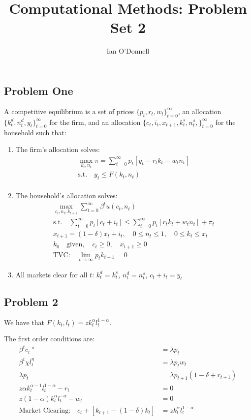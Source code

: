 \documentclass{article}
\title{Computational Methods: Problem Set 2}
\author{Ian O'Donnell}
\date{\vspace{-5ex}}
\begin{document}
\maketitle
\subsection*{Problem One}
A competitive equilibrium is a set of prices $ \{p_t , r_t, w_t\}_{t=0}^\infty $, an allocation $ \{k_t^d, n_t^d, y_t\}_{t=0}^\infty $
for the firm, and an allocation $ \{c_t, i_t, x_{t+1}, k_t^s, n_t^s,\}_{t=0}^\infty $ for the household such that: 
\begin{enumerate}
    \item The firm's allocation solves: 
    \begin{align*}
        \max_{k_t, n_t} \pi = \sum_{t=0}^{\infty} p_t [y_t - r_t k_t - w_t n_t] \\
        \text{s.t.} \quad y_t \leq F(k_t, n_t)\\
    \end{align*}

    \item The household's allocation solves: 
    \begin{gather*}
        \max_{c_t, n_t, k_{t+1}} \sum_{t=0}^{\infty} \beta^t u(c_t, n_t) \\
        \text{s.t.} \quad \sum_{t=0}^{\infty} p_t[c_t + i_t] \leq \sum_{t=0}^{\infty} p_t[r_t k_t + w_t n_t] + \pi _t \\
        x_{t+1} = (1-\delta) x_t + i_t, \quad 0 \leq n_t \leq 1, \quad 0 \leq k_t \leq x_t \\
        k_0 \quad \text{given}, \quad c_t \geq 0, \quad x_{t+1} \geq 0 \\
        \text{TVC:} \quad \lim_{t \rightarrow \infty} p_t k_{t+1} = 0 
    \end{gather*}

    \item All markets clear for all $t$: $k_t^d = k_t^s$, $n_t^d = n_t^s$, $c_t + i_t = y_t$
\end{enumerate}

\subsection*{Problem 2}
We have that $F(k_t, l_t) = z k_t^\alpha l_t^{1-\alpha}$. 

The first order conditions are: 
\begin{align*}
    \beta^t c_t^{-\sigma} &= \lambda p_t \\
    \beta^t \chi l_t^\eta &= \lambda p_t w_t \\
    \lambda p_t &= \lambda p_{t+1} (1 - \delta + r_{t+1})\\
    z \alpha k_t^{\alpha - 1} l_t^{1-\alpha} - r_t &= 0 \\
    z (1 - \alpha) k_t^{\alpha} l_t^{-\alpha} - w_t &= 0 \\
    \text{Market Clearing:} \quad c_t + [k_{t+1} - (1-\delta)k_t] &= z k_t^\alpha l_t^{1-\alpha} 
\end{align*}
\end{document}
